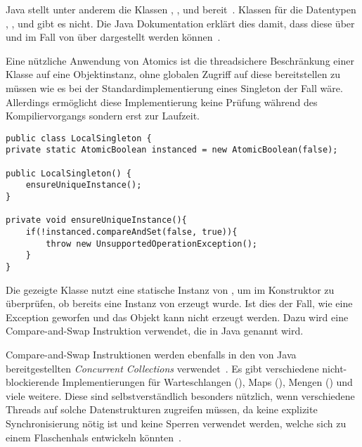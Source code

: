 Java stellt unter anderem die Klassen , ,  und 
bereit~\cite[S.~131]{Friesen2015}. Klassen für die Datentypen , ,  und  gibt es nicht. Die Java Dokumentation erklärt dies damit, dass diese über  und im Fall von  über  dargestellt werden können~\cite{Java7DocAtomic}.

Eine nützliche Anwendung von Atomics ist die threadsichere Beschränkung einer Klasse auf eine Objektinstanz, ohne globalen Zugriff auf diese bereitstellen zu müssen wie es bei der Standardimplementierung eines Singleton der Fall wäre. Allerdings ermöglicht diese Implementierung keine Prüfung während des Kompiliervorgangs sondern erst zur Laufzeit.
\begin{lstlisting}
public class LocalSingleton {
private static AtomicBoolean instanced = new AtomicBoolean(false);

public LocalSingleton() {
	ensureUniqueInstance();
}

private void ensureUniqueInstance(){
	if(!instanced.compareAndSet(false, true)){
		throw new UnsupportedOperationException();
	}
}
\end{lstlisting}
Die gezeigte Klasse  nutzt eine statische Instanz von , um im Konstruktor zu überprüfen, ob bereits eine Instanz von  erzeugt wurde. Ist dies der Fall, wie eine Exception geworfen und das Objekt kann nicht erzeugt werden. Dazu wird eine Compare-and-Swap Instruktion verwendet, die in Java  genannt wird.

Compare-and-Swap Instruktionen werden ebenfalls in den von Java bereitgestellten \emph{Concurrent Collections} verwendet~\cite[S. 133~f.]{Friesen2015}. Es gibt verschiedene nicht-blockierende Implementierungen für Warteschlangen (), Maps (), Mengen () und viele weitere. Diese sind selbstverständlich besonders nützlich, wenn verschiedene Threads auf solche Datenstrukturen zugreifen müssen, da keine explizite Synchronisierung nötig ist und keine Sperren verwendet werden, welche sich zu einem Flaschenhals entwickeln könnten~\cite[S.~125~ff.]{Friesen2015}.

